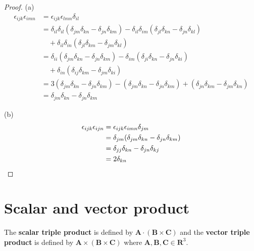 \begin{proof}
(a)
\begin{equation*}
\begin{split}
\epsilon_{ijk} \epsilon_{imn}
&=  \epsilon_{ijk} \epsilon_{lmn} \delta_{il} \\
&= \delta_{il} \delta_{il} (\delta_{jm} \delta_{kn} - \delta_{jn} \delta_{km})
  - \delta_{il} \delta_{im} (\delta_{jl} \delta_{kn} - \delta_{jn} \delta_{kl}) \\
& \quad + \delta_{il} \delta_{in} (\delta_{jl} \delta_{km} - \delta_{jm} \delta_{kl}) \\
&= \delta_{ii} (\delta_{jm} \delta_{kn} - \delta_{jn} \delta_{km})
- \delta_{im} (\delta_{ji} \delta_{kn} - \delta_{jn} \delta_{ki}) \\
& \quad + \delta_{in} (\delta_{ij} \delta_{km} - \delta_{jm} \delta_{ki}) \\
&= 3 (\delta_{jm} \delta_{kn} - \delta_{jn} \delta_{km})
 - (\delta_{jm} \delta_{kn} - \delta_{jn} \delta_{km})
 + (\delta_{jn} \delta_{km} - \delta_{jm} \delta_{kn}) \\
 &= \delta_{jm}\delta_{kn} - \delta_{jn}\delta_{km}
\end{split}
\end{equation*}

(b)
\begin{equation*}
\begin{split}
\epsilon_{ijk} \epsilon_{ijn} &= \epsilon_{ijk} \epsilon_{imn} \delta_{jm} \\
&= \delta_{jm} (\delta_{jm}\delta_{kn} - \delta_{jn}\delta_{km}) \\
&= \delta_{jj} \delta_{kn} - \delta_{jn} \delta_{kj} \\
&= 2 \delta_{kn} \qedhere
\end{split}
\end{equation*}
\end{proof}

\section{Scalar and vector product}

\newcommand{\A}{\mathbf{A}}
\newcommand{\B}{\mathbf{B}}
\newcommand{\C}{\mathbf{C}}
\newcommand{\D}{\mathbf{D}}

\begin{definition}
The \textbf{scalar triple product} is defined by
$\A\cdot (\B\times\C)$ and the \textbf{vector triple product} is defined by
$\A\times (\B\times\C)$ where $\A, \B, \C\in \mathbf{R}^3$.
\end{definition}

